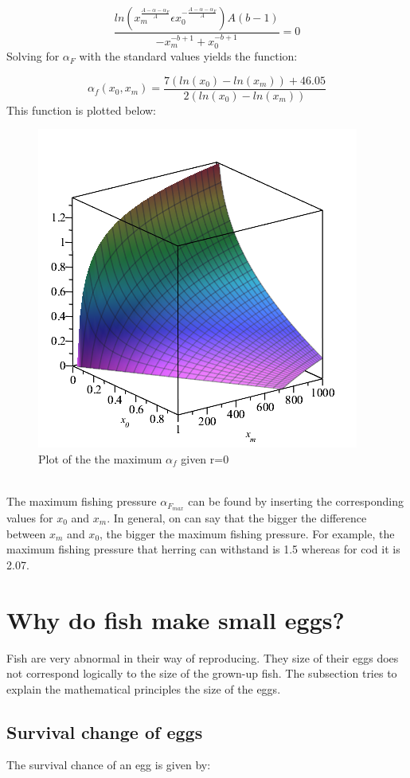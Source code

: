 \documentclass{article}
\numberwithin{equation}{section} %
\begin{document}
\begin{equation}
	\dfrac{ln\left( x_m^{\tfrac{A-\alpha-\alpha_F}{A}}\epsilon x_0^{-\tfrac{A-\alpha-\alpha_F}{A}}\right)A(b-1)}{-x_m^{-b+1}+x_0^{-b+1}} = 0
\end{equation}
Solving for $\alpha_F$ with the standard values yields the function: 

\begin{equation}
    \alpha_f(x_0,x_m)=\dfrac{7(ln(x_0)-ln(x_m))+46.05}{2(ln(x_0)-ln(x_m))}
\end{equation}
This function is plotted below:

\begin{figure}[H]
\centering
\includegraphics[width=.6\textwidth]{exercises/ex4p4}
	\caption{Plot of the the maximum $\alpha_f$ given r=0}
	\label{fig:ex4p4}
\end{figure}\\

The maximum fishing pressure $\alpha_{F_{max}}$ can be found by inserting the corresponding values for $x_0$ and $x_m$. In general, on can say that the bigger the difference between $x_m$ and $x_0$, the bigger the maximum fishing pressure. For example, the maximum fishing pressure that herring can withstand is 1.5 whereas for cod it is 2.07.
\newpage
\section{Why do fish make small eggs?}\label{sec:Ex5}
Fish are very abnormal in their way of reproducing. They size of their eggs does not correspond logically to the size of the grown-up fish. The subsection tries to explain the mathematical principles the size of the eggs. 

\subsection{Survival change of eggs}
The survival chance of an egg is given by:
\end{document}
